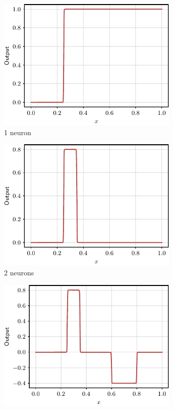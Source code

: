 \begin{figure}
    \centering
    \begin{subfigure}[b]{0.32\textwidth}
    \includegraphics[width=0.95\textwidth]{images/step_function.pdf}
    \caption{1 neuron}
    \label{fig:step_function}
    \end{subfigure}
    \hfill
    \begin{subfigure}[b]{0.32\textwidth}
    \includegraphics[width=0.95\textwidth]{images/bin.pdf}
    \caption{2 neurons}
    \label{fig:bin_function}
    \end{subfigure}
    \begin{subfigure}[b]{0.32\textwidth}
    \includegraphics[width=0.95\textwidth]{images/bin_2.pdf}

\end{subfigure}
\end{figure}
